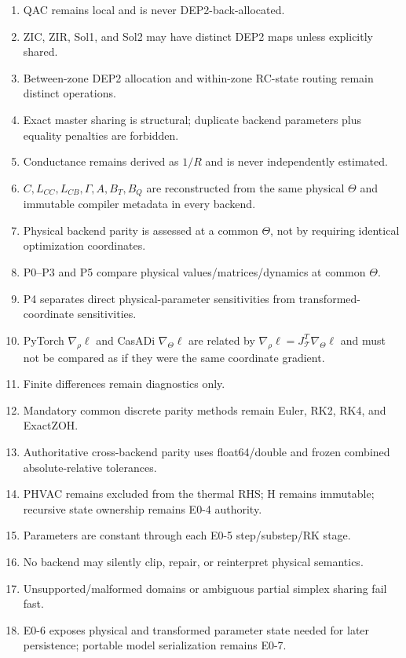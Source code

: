 \documentclass[11pt]{article}
\begin{document}
\begin{enumerate}[leftmargin=*]
\item QAC remains local and is never DEP2-back-allocated.
\item ZIC, ZIR, Sol1, and Sol2 may have distinct DEP2 maps unless explicitly shared.
\item Between-zone DEP2 allocation and within-zone RC-state routing remain distinct operations.
\item Exact master sharing is structural; duplicate backend parameters plus equality penalties are forbidden.
\item Conductance remains derived as $1/R$ and is never independently estimated.
\item $C,L_{CC},L_{CB},\Gamma,A,B_T,B_Q$ are reconstructed from the same physical $\Theta$ and immutable compiler metadata in every backend.
\item Physical backend parity is assessed at a common $\Theta$, not by requiring identical optimization coordinates.
\item P0--P3 and P5 compare physical values/matrices/dynamics at common $\Theta$.
\item P4 separates direct physical-parameter sensitivities from transformed-coordinate sensitivities.
\item PyTorch $\nabla_\rho\ell$ and CasADi $\nabla_\Theta\ell$ are related by $\nabla_\rho\ell=J_{\mathcal T}^T\nabla_\Theta\ell$ and must not be compared as if they were the same coordinate gradient.
\item Finite differences remain diagnostics only.
\item Mandatory common discrete parity methods remain Euler, RK2, RK4, and ExactZOH.
\item Authoritative cross-backend parity uses float64/double and frozen combined absolute-relative tolerances.
\item PHVAC remains excluded from the thermal RHS; H remains immutable; recursive state ownership remains E0-4 authority.
\item Parameters are constant through each E0-5 step/substep/RK stage.
\item No backend may silently clip, repair, or reinterpret physical semantics.
\item Unsupported/malformed domains or ambiguous partial simplex sharing fail fast.
\item E0-6 exposes physical and transformed parameter state needed for later persistence; portable model serialization remains E0-7.
\end{enumerate}
\end{document}
